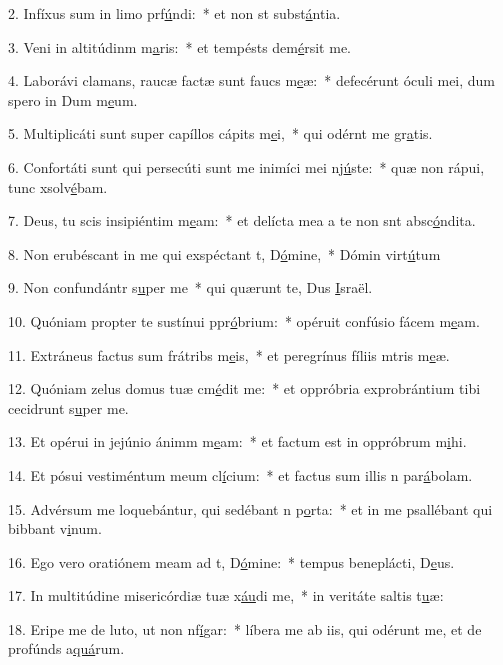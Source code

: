 2. Infíxus sum in limo prf\uline{ú}ndi:~* et non st subst\uline{á}ntia.\par 
3. Veni in altitúdinm m\uline{a}ris:~* et tempésts dem\uline{é}rsit me.\par 
4. Laborávi clamans, raucæ factæ sunt faucs m\uline{e}æ:~* defecérunt óculi mei, dum spero in Dum m\uline{e}um.\par 
5. Multiplicáti sunt super capíllos cápits m\uline{e}i,~* qui odérnt me gr\uline{a}tis.\par 
6. Confortáti sunt qui persecúti sunt me inimíci mei nj\uline{ú}ste:~* quæ non rápui, tunc xsolv\uline{é}bam.\par 
7. Deus, tu scis insipiéntim m\uline{e}am:~* et delícta mea a te non snt absc\uline{ó}ndita.\par 
8. Non erubéscant in me qui exspéctant t, D\uline{ó}mine,~* Dómin virt\uline{ú}tum\par 
9. Non confundántr s\uline{u}per me~* qui quærunt te, Dus \uline{I}sraël.\par 
10. Quóniam propter te sustínui ppr\uline{ó}brium:~* opéruit confúsio fácem m\uline{e}am.\par 
11. Extráneus factus sum frátribs m\uline{e}is,~* et peregrínus fíliis mtris m\uline{e}æ.\par 
12. Quóniam zelus domus tuæ cm\uline{é}dit me:~* et oppróbria exprobrántium tibi cecidrunt s\uline{u}per me.\par 
13. Et opérui in jejúnio ánimm m\uline{e}am:~* et factum est in oppróbrum m\uline{i}hi.\par 
14. Et pósui vestiméntum meum cl\uline{í}cium:~* et factus sum illis n par\uline{á}bolam.\par 
15. Advérsum me loquebántur, qui sedébant n p\uline{o}rta:~* et in me psallébant qui bibbant v\uline{i}num.\par 
16. Ego vero oratiónem meam ad t, D\uline{ó}mine:~* tempus beneplácti, D\uline{e}us.\par 
17. In multitúdine misericórdiæ tuæ x\uline{áu}di me,~* in veritáte saltis t\uline{u}æ:\par 
18. Eripe me de luto, ut non nf\uline{í}gar:~* líbera me ab iis, qui odérunt me, et de profúnds a\uline{quá}rum.\par 
